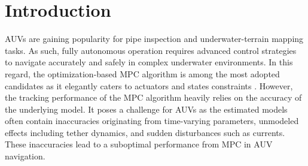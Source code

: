 \section{Introduction}
\label{sec:introduction}











\acp{AUV} are gaining popularity for pipe inspection and underwater-terrain mapping tasks. As such, fully autonomous operation requires advanced control strategies to navigate accurately and safely in complex underwater environments. In this regard, the optimization-based \ac{MPC} algorithm is among the most adopted candidates as it elegantly caters to actuators and states constraints \cite{mpc_survey, vtnmpc}. However, the tracking performance of the \ac{MPC} algorithm heavily relies on the accuracy of the underlying model. It poses a challenge for \acp{AUV} as the estimated models often contain inaccuracies originating from time-varying parameters, unmodeled effects including tether dynamics, and sudden disturbances such as currents. These inaccuracies lead to a suboptimal performance from MPC in AUV navigation.







